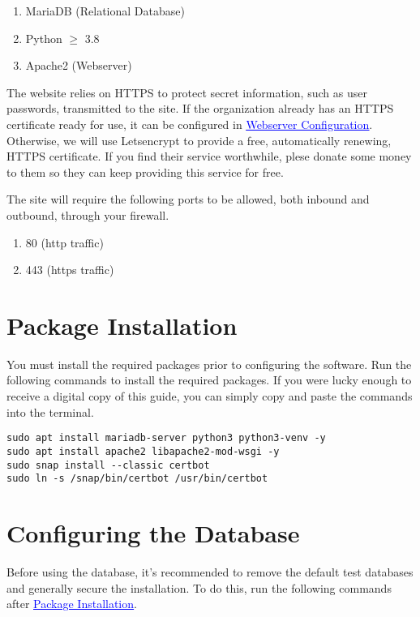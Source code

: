 \begin{enumerate}
    \item MariaDB (Relational Database)
    \item Python $\geq$ 3.8
    \item Apache2 (Webserver)
\end{enumerate}

The website relies on HTTPS to protect secret information, such as user passwords, transmitted to the site. If the organization already has an HTTPS certificate ready for use, it can be configured in \hyperref[webserver_configuration]{\textcolor{blue}{\underline{Webserver Configuration}}}. Otherwise, we will use Letsencrypt to provide a free, automatically renewing, HTTPS certificate. If you find their service worthwhile, plese donate some money to them so they can keep providing this service for free.

The site will require the following ports to be allowed, both inbound and outbound, through your firewall.

\begin{enumerate}
    \item 80 (http traffic)
    \item 443 (https traffic)
\end{enumerate}

\section{Package Installation} \label{package_installation}

You must install the required packages prior to configuring the software. Run the following commands to install the required packages. If you were lucky enough to receive a digital copy of this guide, you can simply copy and paste the commands into the terminal.

\begin{verbatim}
sudo apt install mariadb-server python3 python3-venv -y
sudo apt install apache2 libapache2-mod-wsgi -y
sudo snap install --classic certbot
sudo ln -s /snap/bin/certbot /usr/bin/certbot
\end{verbatim}

\section{Configuring the Database} \label{configure_database}

Before using the database, it's recommended to remove the default test databases and generally secure the installation. To do this, run the following commands after \hyperref[package_installation]{\textcolor{blue}{\underline{Package Installation}}}.

